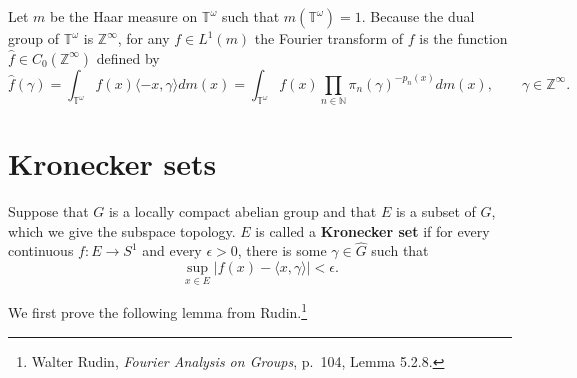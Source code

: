 \documentclass{article}
\newcommand{\inner}[2]{\langle #1, #2 \rangle}
\begin{document}
Let $m$ be the Haar measure on $\mathbb{T}^\omega$ such that $m(\mathbb{T}^\omega)=1$. 
Because the dual group of $\mathbb{T}^\omega$ is $\mathbb{Z}^\infty$, for any $f \in L^1(m)$ the Fourier transform of $f$ is
the function $\hat{f} \in C_0(\mathbb{Z}^\infty)$ defined by
\[
\hat{f}(\gamma) = \int_{\mathbb{T}^\omega} f(x) \inner{-x}{\gamma} dm(x)
=\int_{\mathbb{T}^\omega} f(x) \prod_{n \in \mathbb{N}} \pi_n(\gamma)^{-p_n(x)} dm(x),\qquad \gamma \in \mathbb{Z}^\infty.
\]






\section{Kronecker sets}
Suppose that $G$ is a locally compact abelian group and that $E$ is a subset of $G$, which we give the subspace
topology.
$E$ is called a \textbf{Kronecker set} if
for every continuous $f:E \to S^1$ and every $\epsilon>0$, there is some $\gamma \in \widehat{G}$ such that
\[
\sup_{x \in E} |f(x)-\inner{x}{\gamma}|<\epsilon.
\] 

We first prove the following lemma from Rudin.\footnote{Walter Rudin, {\em Fourier Analysis on Groups}, p.~104, Lemma 5.2.8.}
\end{document}
